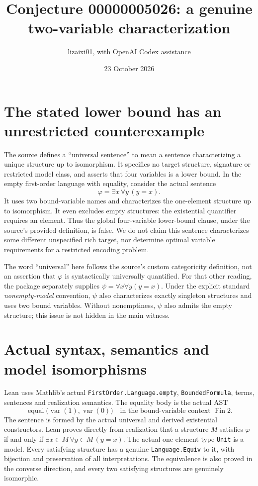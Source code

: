 \documentclass[11pt]{article}
\title{Conjecture 00000005026: a genuine two-variable characterization}
\author{lizaixi01, with OpenAI Codex assistance}
\date{23 October 2026}
\begin{document}
\maketitle
\section{The stated lower bound has an unrestricted counterexample}
The source defines a ``universal sentence'' to mean a sentence
characterizing a unique structure up to isomorphism. It specifies
no target structure, signature or restricted model class, and
asserts that four variables is a lower bound. In the empty
first-order language with equality, consider the actual sentence
\[
 \varphi=\exists x\,\forall y\,(y=x).
\]
It uses two bound-variable names and characterizes the one-element
structure up to isomorphism. It even excludes empty structures:
the existential quantifier requires an element. Thus the global
four-variable lower-bound clause, under the source's provided
definition, is false. We do not claim this sentence characterizes
some different unspecified rich target, nor determine optimal
variable requirements for a restricted encoding problem.

The word ``universal'' here follows the source's custom
categoricity definition, not an assertion that $\varphi$ is
syntactically universally quantified. For that other reading,
the package separately supplies $\psi=\forall x\forall y(y=x)$.
Under the explicit standard \emph{nonempty-model} convention,
$\psi$ also characterizes exactly singleton structures and uses
two bound variables. Without nonemptiness, $\psi$ also admits the
empty structure; this issue is not hidden in the main witness.

\section{Actual syntax, semantics and model isomorphisms}
Lean uses Mathlib's actual \texttt{FirstOrder.Language.empty},
\texttt{BoundedFormula}, terms, sentences and realization semantics.
The equality body is the actual AST
\[
 \operatorname{equal}\bigl(\operatorname{var}(1),
                              \operatorname{var}(0)\bigr)
 \quad\text{in the bound-variable context }\operatorname{Fin}2.
\]
The sentence is formed by the actual universal and derived
existential constructors. Lean proves directly from realization
that a structure $M$ satisfies $\varphi$ if and only if
$\exists x\in M\,\forall y\in M\,(y=x)$.
The actual one-element type \texttt{Unit} is a model. Every
satisfying structure has a genuine \texttt{Language.Equiv} to it,
with bijection and preservation of all interpretations. The
equivalence is also proved in the converse direction, and every
two satisfying structures are genuinely isomorphic.
\end{document}
